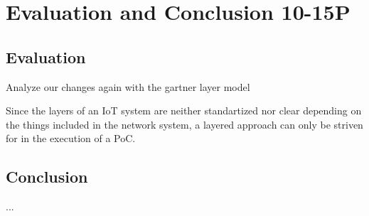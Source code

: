 
\chapter{Evaluation and Conclusion 10-15P} %

\label{Chapter4} %

\section{Evaluation}
Analyze our changes again with the gartner layer model 

Since the layers of an IoT system are neither standartized nor clear depending on the things included in the network system, a layered approach can only be striven for in the execution of a PoC. 
\section{Conclusion}
...



